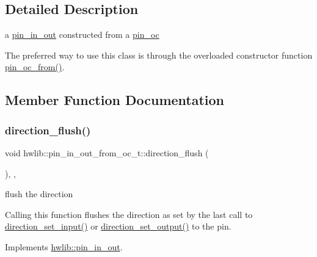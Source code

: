 \subsection{Detailed Description}
a \hyperlink{classhwlib_1_1pin__in__out}{pin\+\_\+in\+\_\+out} constructed from a \hyperlink{classhwlib_1_1pin__oc}{pin\+\_\+oc}

The preferred way to use this class is through the overloaded constructor function \hyperlink{namespacehwlib_aa2c63efcb24f3d5124567356d8c8a804}{pin\+\_\+oc\+\_\+from()}. 

\subsection{Member Function Documentation}
\mbox{\label{classhwlib_1_1pin__in__out__from__oc__t_a906190c8ee6e6846235a33d98a258eb1}} 
\subsubsection{\texorpdfstring{direction\+\_\+flush()}{direction\_flush()}}
{\footnotesize\ttfamily void hwlib\+::pin\+\_\+in\+\_\+out\+\_\+from\+\_\+oc\+\_\+t\+::direction\+\_\+flush (\begin{DoxyParamCaption}{ }\end{DoxyParamCaption})\hspace{0.3cm}{\ttfamily [inline]}, {\ttfamily [override]}, {\ttfamily [virtual]}}

flush the direction

Calling this function flushes the direction as set by the last call to \hyperlink{classhwlib_1_1pin__in__out__from__oc__t_afb5147f7a8a702c839d0d55b7b3f245d}{direction\+\_\+set\+\_\+input()} or \hyperlink{classhwlib_1_1pin__in__out__from__oc__t_a792d6b72134b11f0e9ffe9989b8287e6}{direction\+\_\+set\+\_\+output()} to the pin. 

Implements \hyperlink{classhwlib_1_1pin__in__out_a86ef2b296683d8c0133280075c82cb51}{hwlib\+::pin\+\_\+in\+\_\+out}.

\mbox{\label{classhwlib_1_1pin__in__out__from__oc__t_afb5147f7a8a702c839d0d55b7b3f245d}} 

